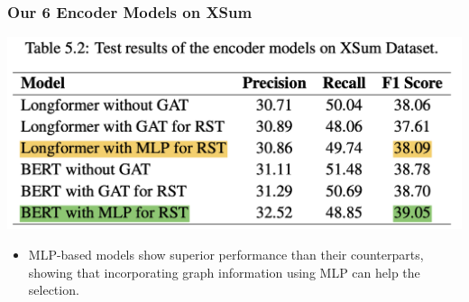 \documentclass{beamer}
\begin{document}
\begin{frame}
\frametitle{Our 6 Encoder Models on XSum}

   \begin{minipage}[t][0.5\textheight][t]{\textwidth}
      \centering
      \includegraphics[width=\textwidth]{imgs/table52_highlight.png} 
  \end{minipage}

  \vfill

  \begin{minipage}[t][0.3\textheight][t]{\textwidth}
    \begin{itemize}
      \item MLP-based models show superior performance than their counterparts, showing that incorporating graph information using MLP can help the selection. 
    \end{itemize}
  \end{minipage}
 
\end{frame}
\end{document}
